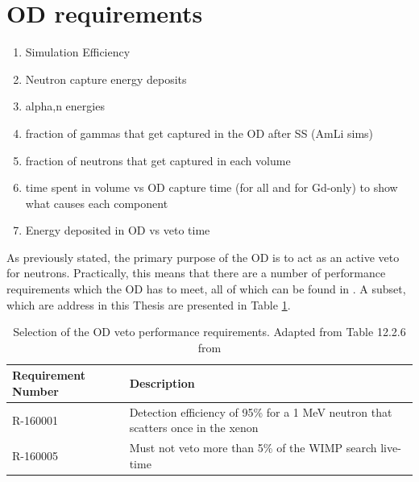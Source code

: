\section{OD requirements}

\begin{tcolorbox}[colback=red!5!white, colframe=red!50!black, title=Key Plots]
\begin{enumerate}
    \item Simulation Efficiency
    \item Neutron capture energy deposits
    \item alpha,n energies
    \item fraction of gammas that get captured in the OD after SS (AmLi sims)
    \item fraction of neutrons that get captured in each volume
    \item time spent in volume vs OD capture time (for all and for Gd-only) to show what causes each component
    \item Energy deposited in OD vs veto time
\end{enumerate}
\end{tcolorbox}

\par
As previously stated, the primary purpose of the OD is to act as an active veto for neutrons.
Practically, this means that there are a number of performance requirements which the OD has to meet, all of which can be found in \cite{LZ_TechnicalDesignReview_ref}.
A subset, which are address in this Thesis are presented in Table \ref{tab:veto_requirements}.

\begin{table}[!htbp]
    \centering
    \begin{tabular}{p{}p{}} %
    \hline
    {Requirement Number} & {Description} \\ \hline
    R-160001             & Detection efficiency of 95\% for a 1 MeV neutron that scatters once in the xenon \\
    R-160005             & Must not veto more than 5\% of the WIMP search live-time
    \end{tabular}
    \caption{Selection of the OD veto performance requirements. Adapted from Table 12.2.6 from \cite{LZ_TechnicalDesignReview_ref}}
    \label{tab:veto_requirements}
\end{table} 

